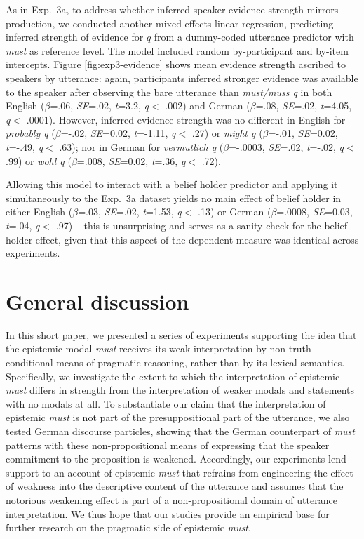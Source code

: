 \documentclass[11pt]{article}
\newcommand{\figref}[1]{Figure \ref{#1}}
\begin{document}
As in Exp.~3a, to address whether inferred speaker evidence strength mirrors production, we conducted another mixed effects linear regression, predicting inferred strength of evidence for $q$ from a dummy-coded utterance predictor with \emph{must} as reference level. The model included random by-participant and by-item intercepts.  \figref{fig:exp3-evidence} shows mean evidence strength ascribed to speakers by utterance:  again, participants inferred stronger evidence was available to the speaker after observing the bare utterance than \emph{must/muss q} in both English ($\beta$=.06, \emph{SE}=.02, \emph{t}=3.2, \emph{q}$<$ .002) and German ($\beta$=.08, \emph{SE}=.02, \emph{t}=4.05, \emph{q}$<$ .0001). However, inferred evidence strength was no different in English for \emph{probably q} ($\beta$=-.02, \emph{SE}=0.02, \emph{t}=-1.11, \emph{q}$<$ .27) or \emph{might q} ($\beta$=-.01, \emph{SE}=0.02, \emph{t}=-.49, \emph{q}$<$ .63); nor in German for \emph{vermutlich q} ($\beta$=-.0003, \emph{SE}=.02, \emph{t}=-.02, \emph{q}$<$ .99) or \emph{wohl q} ($\beta$=.008, \emph{SE}=0.02, \emph{t}=.36, \emph{q}$<$ .72).

Allowing this model to interact with a belief holder predictor and applying it simultaneously to the Exp.~3a dataset yields no main effect of belief holder in either English ($\beta$=.03, \emph{SE}=.02, \emph{t}=1.53, \emph{q}$<$ .13) or German ($\beta$=.0008, \emph{SE}=0.03, \emph{t}=.04, \emph{q}$<$ .97) -- this is unsurprising and serves as a sanity check for the belief holder effect, given that this aspect of the dependent measure was identical across experiments.


\section{General discussion}
In this short paper, we presented a series of experiments supporting the idea that the epistemic modal \emph{must} receives its weak interpretation by non-truth-conditional means of pragmatic reasoning, rather than by its lexical semantics. Specifically, we investigate the extent to which the interpretation of epistemic \emph{must} differs in strength from the interpretation of weaker modals and statements with no modals at all. To substantiate our claim that the interpretation of epistemic \emph{must} is not part of the presuppositional part of the utterance, we also tested German discourse particles, showing that the German counterpart of \emph{must} patterns with these non-propositional means of expressing that the speaker commitment to the proposition is weakened. Accordingly, our experiments lend support to an account of epistemic \emph{must} that refrains from engineering the effect of weakness into the descriptive content of the utterance and assumes that the notorious weakening effect is part of a non-propositional domain of utterance interpretation. We thus hope that our studies provide an empirical base for further research on the pragmatic side of epistemic \emph{must}.
\end{document}
